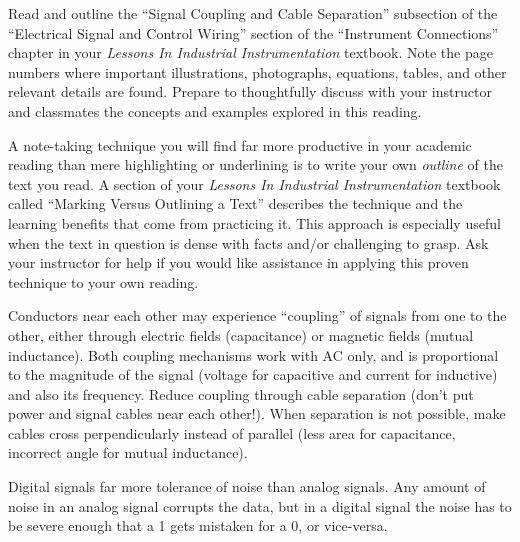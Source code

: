 

Read and outline the ``Signal Coupling and Cable Separation'' subsection of the ``Electrical Signal and Control Wiring'' section of the ``Instrument Connections'' chapter in your {\it Lessons In Industrial Instrumentation} textbook.  Note the page numbers where important illustrations, photographs, equations, tables, and other relevant details are found.  Prepare to thoughtfully discuss with your instructor and classmates the concepts and examples explored in this reading.

\vskip 30pt

A note-taking technique you will find far more productive in your academic reading than mere highlighting or underlining is to write your own {\it outline} of the text you read.  A section of your {\it Lessons In Industrial Instrumentation} textbook called ``Marking Versus Outlining a Text'' describes the technique and the learning benefits that come from practicing it.  This approach is especially useful when the text in question is dense with facts and/or challenging to grasp.  Ask your instructor for help if you would like assistance in applying this proven technique to your own reading.














Conductors near each other may experience ``coupling'' of signals from one to the other, either through electric fields (capacitance) or magnetic fields (mutual inductance).  Both coupling mechanisms work with AC only, and is proportional to the magnitude of the signal (voltage for capacitive and current for inductive) and also its frequency.  Reduce coupling through cable separation (don't put power and signal cables near each other!).  When separation is not possible, make cables cross perpendicularly instead of parallel (less area for capacitance, incorrect angle for mutual inductance).

\vskip 10pt

Digital signals far more tolerance of noise than analog signals.  Any amount of noise in an analog signal corrupts the data, but in a digital signal the noise has to be severe enough that a 1 gets mistaken for a 0, or vice-versa.









